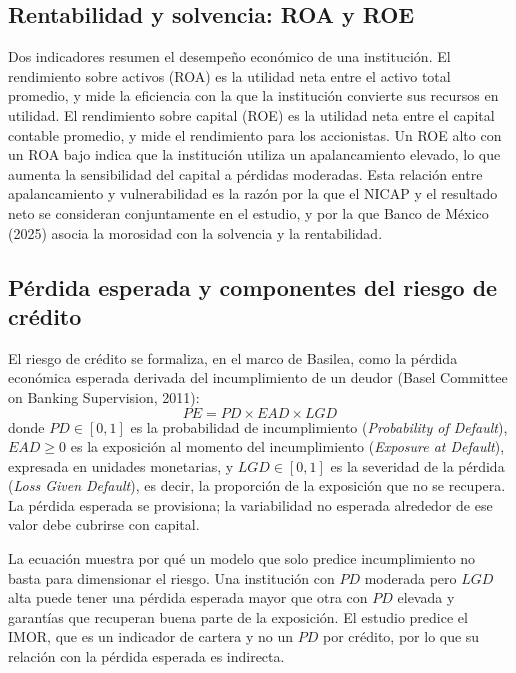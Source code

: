 \subsection{Rentabilidad y solvencia: ROA y ROE}
Dos indicadores resumen el desempeño económico de una institución. El rendimiento sobre activos (ROA) es la utilidad neta entre el activo total promedio, y mide la eficiencia con la que la institución convierte sus recursos en utilidad. El rendimiento sobre capital (ROE) es la utilidad neta entre el capital contable promedio, y mide el rendimiento para los accionistas. Un ROE alto con un ROA bajo indica que la institución utiliza un apalancamiento elevado, lo que aumenta la sensibilidad del capital a pérdidas moderadas. Esta relación entre apalancamiento y vulnerabilidad es la razón por la que el NICAP y el resultado neto se consideran conjuntamente en el estudio, y por la que Banco de México (2025) asocia la morosidad con la solvencia y la rentabilidad.

\subsection{Pérdida esperada y componentes del riesgo de crédito}
El riesgo de crédito se formaliza, en el marco de Basilea, como la pérdida económica esperada derivada del incumplimiento de un deudor (Basel Committee on Banking Supervision, 2011):
\begin{equation}
PE = PD \times EAD \times LGD
\label{eq:perdida_esperada}
\end{equation}
donde $PD \in [0,1]$ es la probabilidad de incumplimiento (\textit{Probability of Default}), $EAD \geq 0$ es la exposición al momento del incumplimiento (\textit{Exposure at Default}), expresada en unidades monetarias, y $LGD \in [0,1]$ es la severidad de la pérdida (\textit{Loss Given Default}), es decir, la proporción de la exposición que no se recupera. La pérdida esperada se provisiona; la variabilidad no esperada alrededor de ese valor debe cubrirse con capital.

La ecuación muestra por qué un modelo que solo predice incumplimiento no basta para dimensionar el riesgo. Una institución con $PD$ moderada pero $LGD$ alta puede tener una pérdida esperada mayor que otra con $PD$ elevada y garantías que recuperan buena parte de la exposición. El estudio predice el IMOR, que es un indicador de cartera y no un $PD$ por crédito, por lo que su relación con la pérdida esperada es indirecta.

